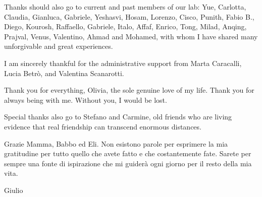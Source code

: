 \begin{acknowledgements}
Thanks should also go to current and past members of our lab: Yue, Carlotta, Claudia, Gianluca, Gabriele, Yeshasvi, Hosam, Lorenzo, Cisco, Punith, Fabio B., Diego, Kourosh, Raffaello, Gabriele, Italo, Affaf, Enrico, Tong, Milad, Anqing, Prajval, Venus, Valentino,  Ahmad and Mohamed, with whom I have
shared many unforgivable and great experiences.

I am sincerely thankful for the administrative support from Marta Caracalli, Lucia Betrò, and Valentina Scanarotti. 

Thank you for everything, Olivia, the sole genuine love of my life. Thank you for always being with me. Without you, I would be lost.

Special thanks also go to Stefano and Carmine, old friends who are living evidence that real friendship can transcend enormous distances.

Grazie Mamma, Babbo ed Eli. Non esistono parole per esprimere la mia gratitudine per tutto quello che avete fatto e che costantemente fate. Sarete per sempre una fonte di ispirazione che mi guiderà ogni giorno per il resto della mia vita. \\

\begin{flushright}
Giulio
\end{flushright}


\end{acknowledgements}
